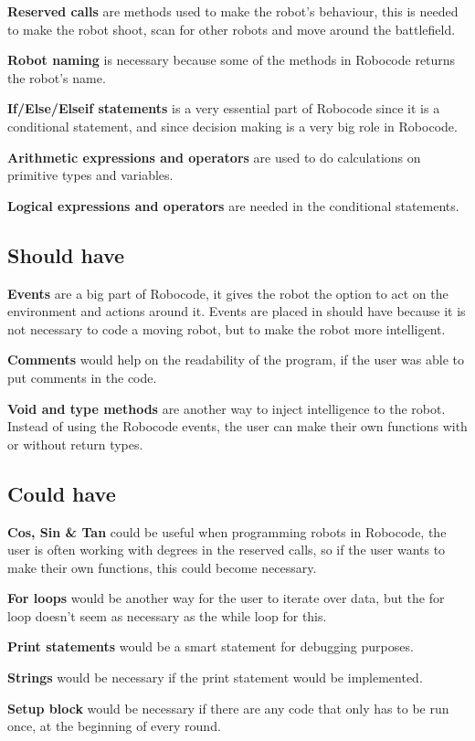 \textbf{Reserved calls} are methods used to make the robot’s behaviour, this is needed to make the robot shoot, scan for other robots and move around the battlefield. 

\textbf{Robot naming} is necessary because some of the methods in Robocode returns the robot’s name. 

\textbf{If/Else/Elseif statements} is a very essential part of Robocode since it is a conditional statement, and since decision making is a very big role in Robocode.

\textbf{Arithmetic expressions and operators} are used to do calculations on primitive types and variables. 

\textbf{Logical expressions and operators} are needed in the conditional statements.

\subsection{Should have}
\textbf{Events} are a big part of Robocode, it gives the robot the option to act on the environment and actions around it. Events are placed in should have because it is not necessary to code a moving robot, but to make the robot more intelligent.

\textbf{Comments} would help on the readability of the program, if the user was able to put comments in the code. 

\textbf{Void and type methods} are another way to inject intelligence to the robot. Instead of using the Robocode events, the user can make their own functions with or without return types. 

\subsection{Could have} 
\textbf{Cos, Sin \& Tan} could be useful when programming robots in Robocode, the user is often working with degrees in the reserved calls, so if the user wants to make their own functions, this could become necessary.

\textbf{For loops} would be another way for the user to iterate over data, but the for loop doesn't seem as necessary as the while loop for this.

\textbf{Print statements} would be a smart statement for debugging purposes.

\textbf{Strings} would be necessary if the print statement would be implemented.

\textbf{Setup block} would be necessary if there are any code that only has to be run once, at the beginning of every round. 


